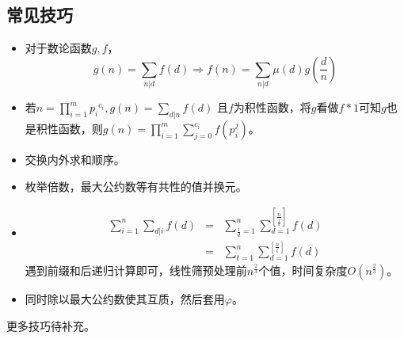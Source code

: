 \subsection{常见技巧}
\begin{itemize}
	\item
	对于数论函数$g,f$，
	\begin{displaymath}
		g(n)=\sum_{n|d}{f(d)}\Rightarrow
		f(n)=\sum_{n|d}{\mu(d)g(\frac{d}{n})}
	\end{displaymath}
	\item
	若$\displaystyle n=\prod_{i=1}^m{{p_i}^{c_i}},g(n)=\sum_{d|n}{f(d)}$
	且$f$为积性函数，将$g$看做$f*1$可知$g$也是积性函数，则$g(n)=\prod_{i=1}^m
	{\sum_{j=0}^{c_i}{f(p_i^j)}}$。
	\item 交换内外求和顺序。
	\item 枚举倍数，最大公约数等有共性的值并换元。
	\item \begin{eqnarray*}
		\sum_{i=1}^n{\sum_{d|i}{f(d)}}&=&
		\sum_{\frac{i}{d}=1}^n{\sum_{d=1}^{[\frac{n}{\frac{i}{d}}]}{f(d)}}\\
		&=&\sum_{t=1}^n{\sum_{d=1}^{[\frac{n}{t}]}{f(d)}}
	\end{eqnarray*}
	遇到前缀和后递归计算即可，线性筛预处理前$n^\frac{2}{3}$个值，时间复杂度$O(n^\frac{2}{3})$。
	\item 同时除以最大公约数使其互质，然后套用$\varphi$。
\end{itemize}
更多技巧待补充。
